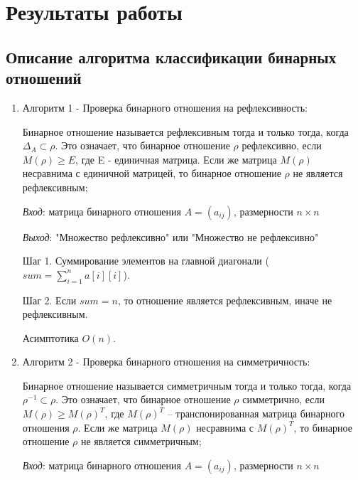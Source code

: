 \documentclass[spec, och, labwork]{shiza}
\begin{document}
\section{Результаты работы}

        \subsection{Описание алгоритма классификации бинарных отношений}
            \begin{enumerate}

                \item Алгоритм 1 - Проверка бинарного отношения на рефлексивность:
                
                Бинарное отношение называется рефлексивным тогда и только тогда, когда $\Delta_A \subset \rho$. Это 
                означает, что бинарное отношение $\rho$ рефлексивно, если $M(\rho) \geq E$, где E - единичная матрица. 
                Если же матрица $M(\rho)$ несравнима с единичной матрицей, то бинарное отношение $\rho$ не является рефлексивным;

                \textit{Вход}: матрица бинарного отношения $A = (a_{ij})$, размерности $n \times n$

                \textit{Выход}: "Множество рефлексивно" или "Множество не рефлексивно"

                Шаг 1. Суммирование элементов на главной диагонали ($sum = \sum\limits_{i=1}^n a[i][i]$). 
                
                Шаг 2. Если $sum = n$, то отношение является рефлексивным, иначе не рефлексивным.

                Асимптотика $O(n)$.

                \item Алгоритм 2 - Проверка бинарного отношения на симметричность:
                
                Бинарное отношение называется симметричным тогда и только тогда, когда $\rho^{-1} \subset \rho$. Это означает, что бинарное 
                отношение $\rho$ симметрично, если $M(\rho) \geq M(\rho)^T$, где $M(\rho)^T$ – транспонированная матрица 
                бинарного отношения $\rho$. Если же матрица $M(\rho)$ несравнима с $M(\rho)^T$, то бинарное отношение $\rho$
                не является симметричным;
                
                \textit{Вход}: матрица бинарного отношения $A = (a_{ij})$, размерности $n \times n$


\end{enumerate}
\end{document}
